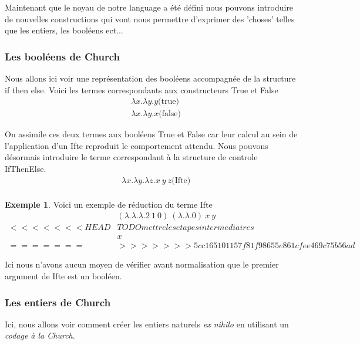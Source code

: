 \documentclass {article}
\theoremstyle{definition}
\newtheorem{example}{Exemple}
\theoremstyle{remark}
\begin{document}
Maintenant que le noyau de notre language a été défini nous pouvons introduire
de nouvelles constructions qui vont nous permettre d'exprimer des 'choses' %
telles que les entiers, les booléens ect...

\subsubsection{Les booléens de Church}

Nous allons ici voir une représentation des booléens accompagnée de la 
structure if then else.
Voici les termes correspondants aux constructeurs True et False
\begin{align*}
  &\lambda x.\lambda y. y \mbox{(true)} \\
  &\lambda x.\lambda y. x \mbox{(false)} 
\end{align*}

On assimile ces deux termes aux booléens True et False car leur calcul au sein
de l'application d'un Ifte reproduit le comportement attendu.
Nous pouvons désormais introduire le terme correspondant à la structure de 
controle IfThenElse.
\begin{align*}
  &\lambda x.\lambda y.\lambda z. x\: y\: z \mbox{(Ifte)} \\
\end{align*}

\begin{example}
  Voici un exemple de réduction du terme Ifte
  \begin{align*}
    &(\lambda .\lambda .\lambda . 2\: 1\: 0) \: (\lambda . \lambda . 0) \: x \: y  \\
<<<<<<< HEAD
    & TODO mettre les etapes intermediaires \\
    & x \\
=======
    & %
>>>>>>> 5cc165101157f81f98655e861cfee469c75b56ad
  \end{align*}
\end{example}

Ici nous n'avons aucun moyen de vérifier avant normalisation que le premier
argument de Ifte est un booléen. %

\subsubsection{Les entiers de Church}

Ici, nous allons voir comment créer
les entiers naturels \textit{ex nihilo} en utilisant un \emph{codage à
  la Church}.
\end{document}

